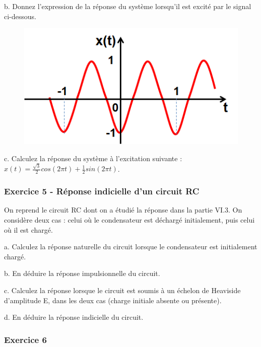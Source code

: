	b. Donnez l'expression de la réponse du système lorsqu'il est excité par le signal ci-dessous.
	
	\begin{figure}[h!]
		\centering
		\includegraphics[scale=0.5]{images/Exo_2_4.png} 
	\end{figure} 
	
	c. Calculez la réponse du système à l'excitation suivante : $x(t)=\frac{\sqrt{3}}{2}cos(2\pi t)+\frac{1}{2}sin(2\pi t)$.\\
	
	
	
	\subsubsection{Exercice 5 - Réponse indicielle d'un circuit RC}
	
	On reprend le circuit RC dont on a étudié la réponse dans la partie VI.3. On considère deux cas : celui où le condensateur est déchargé initialement, puis celui où il est chargé. 
	
	a. Calculez la réponse naturelle du circuit lorsque le condensateur est initialement chargé.
	
	b. En déduire la réponse impulsionnelle du circuit.
	
	c. Calculez la réponse lorsque le circuit est soumis à un échelon de Heaviside d'amplitude E, dans les deux cas (charge initiale absente ou présente).
	
	d. En déduire la réponse indicielle du circuit.
	
	\vspace{1\baselineskip}	
	

	
	\subsubsection{Exercice 6}
	
